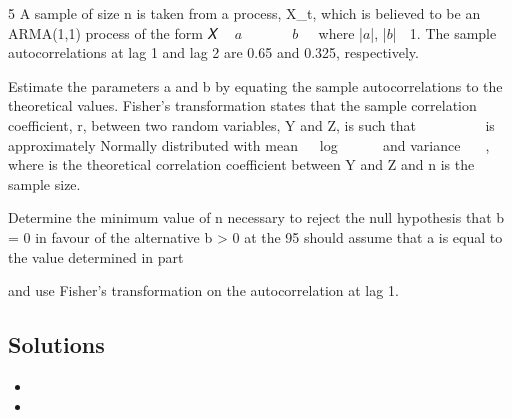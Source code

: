 5 A sample of size n is taken from a process, X_{t}, which is believed to be an ARMA(1,1)
process of the form
𝑋􀯧 􀵌 $a$𝑋􀯧􀬿􀬵 􀵅 𝑒􀯧 􀵅 $b$𝑒􀯧􀬿􀬵
where |$a$|, |$b$| 􀵏 1. The sample autocorrelations at lag 1 and lag 2 are 0.65 and 0.325,
respectively.
\item   Estimate the parameters a and b by equating the sample autocorrelations to the
theoretical values. 
Fisher’s transformation states that the sample correlation coefficient, r, between two
random variables, Y and Z, is such that 􀰭
􀰮􀭪􀭭􀭥􁉀􀰭􀰶􀳝
􀰭􀰷􀳝􁉁 is approximately Normally distributed
with mean 􀬵
􀬶 log 􁉀􀬵􀬾􀮡
􀬵􀬿􀮡􁉁 and variance 􀬵
􀯡􀬿􀬷, where \rho  is the theoretical correlation
coefficient between Y and Z and n is the sample size.
\item   Determine the minimum value of n necessary to reject the null hypothesis that
b = 0 in favour of the alternative b > 0 at the 95%
should assume that a is equal to the value determined in part \item   and use
Fisher’s transformation on the autocorrelation at lag 1. 

\subsection*{Solutions}

\begin{itemize}
\item
\item
\end{itemize}

